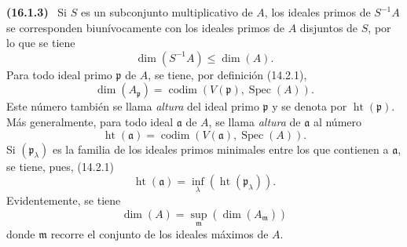 \documentclass[10pt,oneside]{book}
\makeatletter
\newcommand{\setmanualcurrentlabel}[1]{\def\@currentlabel{#1}}
\newcommand{\oldpage}[2][]{%
  \setcounter{footnote}{0}%
  \marginpar{\scriptsize\textbf{#1}~|~#2}\ignorespaces}
\newenvironment{env}[1][]{\setmanualcurrentlabel{#1}\par\medskip\noindent\textbf{(#1)}\ }{\par}
\makeatother
\begin{document}
\begin{env}[16.1.3]
\label{0.16.1.3-es}
\oldpage[0\textsubscript{IV-1}]{23}
Si $S$ es un subconjunto multiplicativo de $A$, los ideales primos de
$S^{-1}A$ se corresponden biunívocamente con los ideales primos de $A$
disjuntos de $S$, por lo que se tiene
\[
\label{0.16.1.3.1-es}
  \dim(S^{-1}A)\leq\dim(A).
\tag{16.1.3.1}
\]
Para todo ideal primo $\mathfrak{p}$ de $A$, se tiene, por definición (14.2.1),
\[
\label{0.16.1.3.2-es}
  \dim(A_{\mathfrak{p}})
  =\operatorname{codim}(V(\mathfrak{p}),\operatorname{Spec}(A)).
\tag{16.1.3.2}
\]
Este número también se llama \emph{altura} del ideal primo $\mathfrak{p}$ y se denota
por $\operatorname{ht}(\mathfrak{p})$. Más generalmente, para todo ideal
$\mathfrak{a}$ de $A$, se llama \emph{altura} de $\mathfrak{a}$ al número
\[
\label{0.16.1.3.3-es}
  \operatorname{ht}(\mathfrak{a})
  =\operatorname{codim}(V(\mathfrak{a}),\operatorname{Spec}(A)).
\tag{16.1.3.3}
\]
Si $(\mathfrak{p}_\lambda)$ es la familia de los ideales primos minimales entre
los que contienen a $\mathfrak{a}$, se tiene, pues, (14.2.1)
\[
\label{0.16.1.3.4-es}
  \operatorname{ht}(\mathfrak{a})
  =\inf_\lambda(\operatorname{ht}(\mathfrak{p}_\lambda)).
\tag{16.1.3.4}
\]
Evidentemente, se tiene
\[
\label{0.16.1.3.5-es}
  \dim(A)=\sup_{\mathfrak{m}}(\dim(A_{\mathfrak{m}}))
\tag{16.1.3.5}
\]
donde $\mathfrak{m}$ recorre el conjunto de los ideales máximos de $A$.
\end{env}
\end{document}
